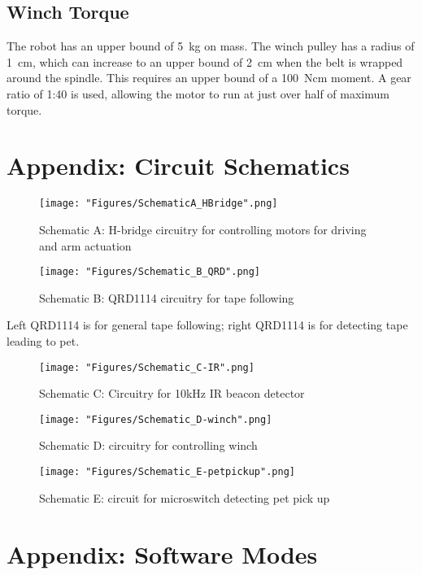 	\subsection{Winch Torque}
	The robot has an upper bound of 5~kg on mass. The winch pulley has a radius of 1~cm, which can increase to an upper bound of 2~cm when the belt is wrapped around the spindle. This requires an upper bound of a 100~Ncm moment. A gear ratio of 1:40 is used, allowing the motor to run at just over half of maximum torque.
	
\newpage	
\section{Appendix: Circuit Schematics}
\label{AppendixB}
\begin{figure}[h]
	\centering
	\texttt{[image: "Figures/SchematicA\_HBridge".png]}
	\caption*{Schematic A: H-bridge circuitry for controlling motors for driving and arm actuation}
	\label{sch:A}
\end{figure}
\newpage
\begin{figure}[ht]
	\centering
	\texttt{[image: "Figures/Schematic\_B\_QRD".png]}
	\caption*{Schematic B: QRD1114 circuitry for tape following}
	\label{sch:B}
\end{figure}

Left QRD1114 is for general tape following; right QRD1114 is for detecting tape leading to pet.

\newpage
\begin{figure}[ht]
	\centering
	\texttt{[image: "Figures/Schematic\_C-IR".png]}
	\caption*{Schematic C: Circuitry for 10kHz IR beacon detector}
	\label{sch:C}
\end{figure}

\newpage
\begin{figure}[ht]
	\centering
	\texttt{[image: "Figures/Schematic\_D-winch".png]}
	\caption*{Schematic D: circuitry for controlling winch}
	\label{sch:D}
\end{figure}

\begin{figure}[ht]
	\centering
	\texttt{[image: "Figures/Schematic\_E-petpickup".png]}
	\caption*{Schematic E: circuit for microswitch detecting pet pick up}
	\label{sch:E}
\end{figure}
\FloatBarrier

\section{Appendix: Software Modes}
\label{AppendixC}

